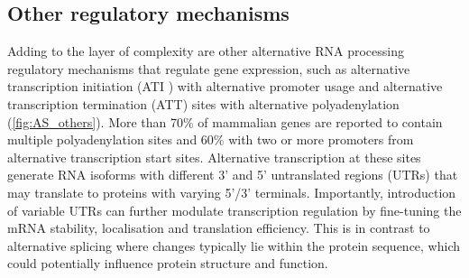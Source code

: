 \newpage
\subsection{Other regulatory mechanisms}
Adding to the layer of complexity are other alternative RNA processing regulatory mechanisms that regulate gene expression, such as alternative transcription initiation (ATI ) with alternative promoter usage and alternative transcription termination (ATT) sites with alternative polyadenylation (\cref{fig:AS_others}). More than 70\% of mammalian genes are reported to contain multiple polyadenylation sites and 60\% with two or more promoters from alternative transcription start sites\cite{Carninci2006}. Alternative transcription at these sites generate RNA isoforms with different 3' and 5' untranslated regions (UTRs) that may translate to proteins with varying 5'/3' terminals. Importantly, introduction of variable UTRs can further modulate transcription regulation by fine-tuning the mRNA stability, localisation and translation efficiency\cite{Reyes2018}. This is in contrast to alternative splicing where changes typically lie within the protein sequence, which could potentially influence protein structure and function.

